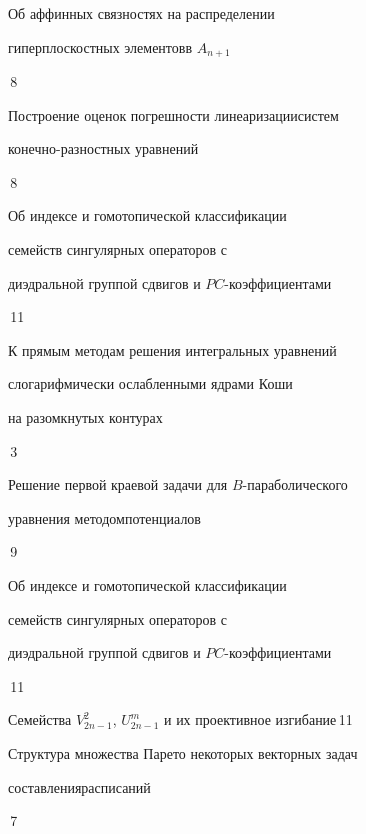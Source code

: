 \bigskip










{Об аффинных связностях на распределении 


гиперплоскостных элементов\newline в $A_{n+1}$}{\No\,8}




{Построение оценок погрешности линеаризации\newline систем 


конечно-разностных уравнений}{\No\,8}




{Об индексе и гомотопической классификации \newline


семейств сингулярных операторов с


диэдральной группой сдвигов и $PC$-коэффициентами}{\No\,11}




{К прямым методам решения интегральных уравнений 


с\newline логарифмически ослабленными ядрами Коши 


на разомкнутых контурах}{\No\,3}




{Решение первой краевой задачи для $B$-параболического 


уравнения методом\newline потенциалов}{\No\,9}




{Об индексе и гомотопической классификации \newline


семейств сингулярных операторов с


диэдральной группой сдвигов и $PC$-коэффициентами}{\No\,11}




{Семейства $V^2_{2n-1}$, $U^m_{2n-1}$ и их проективное изгибание}{\No\,11}




{Структура множества Парето некоторых векторных задач  


составления\newline расписаний}{\No\,7}


